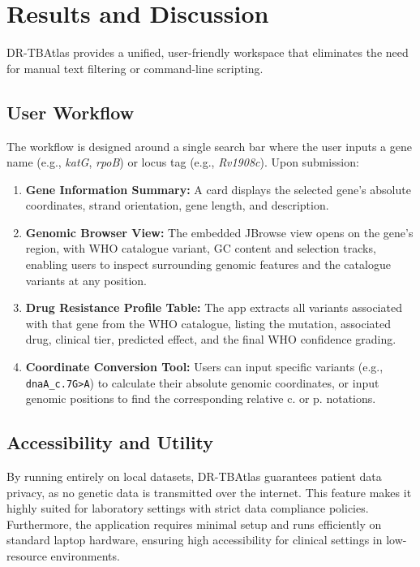 \documentclass{article}
\begin{document}
\section{Results and Discussion}
DR-TBAtlas provides a unified, user-friendly workspace that eliminates the need for manual text filtering or command-line scripting. 

\subsection{User Workflow}
The workflow is designed around a single search bar where the user inputs a gene name (e.g., \textit{katG}, \textit{rpoB}) or locus tag (e.g., \textit{Rv1908c}). Upon submission:
\begin{enumerate}
    \item \textbf{Gene Information Summary:} A card displays the selected gene's absolute coordinates, strand orientation, gene length, and description.
    \item \textbf{Genomic Browser View:} The embedded JBrowse view opens on the gene's region, with WHO catalogue variant, GC content and selection tracks, enabling users to inspect surrounding genomic features and the catalogue variants at any position.
    \item \textbf{Drug Resistance Profile Table:} The app extracts all variants associated with that gene from the WHO catalogue, listing the mutation, associated drug, clinical tier, predicted effect, and the final WHO confidence grading.
    \item \textbf{Coordinate Conversion Tool:} Users can input specific variants (e.g., \texttt{dnaA\_c.7G\textgreater{}A}) to calculate their absolute genomic coordinates, or input genomic positions to find the corresponding relative c. or p. notations.
\end{enumerate}

\subsection{Accessibility and Utility}
By running entirely on local datasets, DR-TBAtlas guarantees patient data privacy, as no genetic data is transmitted over the internet. This feature makes it highly suited for laboratory settings with strict data compliance policies. Furthermore, the application requires minimal setup and runs efficiently on standard laptop hardware, ensuring high accessibility for clinical settings in low-resource environments. 
\end{document}
